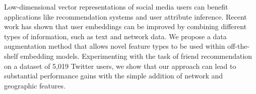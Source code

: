 Low-dimensional vector representations of social media users can benefit applications like recommendation systems and user attribute inference. Recent work has shown that user embeddings can be improved by combining different types of information, such as text and network data. We propose a data augmentation method that allows novel feature types to be used within off-the-shelf embedding models. Experimenting with the task of friend recommendation on a dataset of 5,019 Twitter users, we show that our approach can lead to substantial performance gains with the simple addition of network and geographic features.
